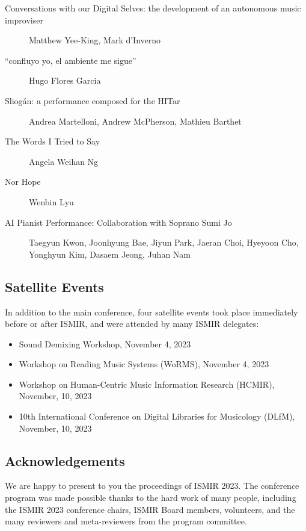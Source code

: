 \begin{description}
\item[Conversations with our Digital Selves: the development of an autonomous music improviser] Matthew Yee-King, Mark d'Inverno

\item[``confluyo yo, el ambiente me sigue''] Hugo Flores Garcia

\item[Sliogán: a performance composed for the HITar] Andrea Martelloni, Andrew McPherson, Mathieu Barthet

\item[The Words I Tried to Say] Angela Weihan Ng

\item[Nor Hope] Wenbin Lyu

\item[AI Pianist Performance: Collaboration with Soprano Sumi Jo] Taegyun Kwon, Joonhyung Bae, Jiyun Park, Jaeran Choi, Hyeyoon Cho, Yonghyun Kim, Dasaem Jeong, Juhan Nam
\end{description}


\subsection*{Satellite Events }

In addition to the main conference, four satellite events took place immediately before or after ISMIR, and were attended by many ISMIR delegates:

\begin{itemize}
    \item Sound Demixing Workshop, November 4, 2023
    \item Workshop on Reading Music Systems (WoRMS), November 4, 2023
    \item Workshop on Human-Centric Music Information Research (HCMIR), November, 10, 2023
    \item 10th International Conference on Digital Libraries for Musicology (DLfM), November, 10, 2023
\end{itemize}


\subsection*{Acknowledgements}

We are happy to present to you the proceedings of ISMIR 2023. The conference program was made possible thanks to the hard work of many people, including the ISMIR 2023 conference chairs, ISMIR Board members, volunteers, and the many reviewers and meta-reviewers from the program committee.

